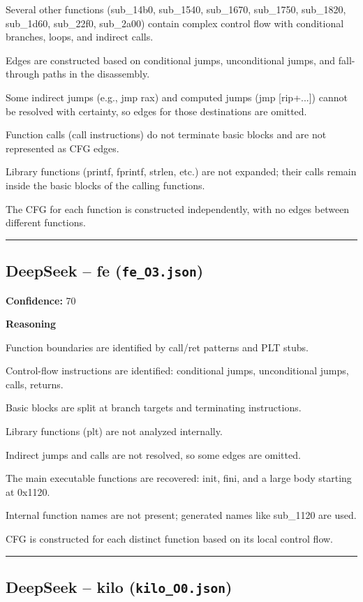 Several other functions (sub\_14b0, sub\_1540, sub\_1670, sub\_1750, sub\_1820, sub\_1d60, sub\_22f0, sub\_2a00) contain complex control flow with conditional branches, loops, and indirect calls.

Edges are constructed based on conditional jumps, unconditional jumps, and fall-through paths in the disassembly.

Some indirect jumps (e.g., jmp rax) and computed jumps (jmp [rip+...]) cannot be resolved with certainty, so edges for those destinations are omitted.

Function calls (call instructions) do not terminate basic blocks and are not represented as CFG edges.

Library functions (printf, fprintf, strlen, etc.) are not expanded; their calls remain inside the basic blocks of the calling functions.

The CFG for each function is constructed independently, with no edges between different functions.

\bigskip
\hrule
\bigskip

\subsection{DeepSeek -- fe (\texttt{fe\_O3.json})}

\textbf{Confidence:} 70

\textbf{Reasoning}

Function boundaries are identified by call/ret patterns and PLT stubs.

Control-flow instructions are identified: conditional jumps, unconditional jumps, calls, returns.

Basic blocks are split at branch targets and terminating instructions.

Library functions (plt) are not analyzed internally.

Indirect jumps and calls are not resolved, so some edges are omitted.

The main executable functions are recovered: init, fini, and a large body starting at 0x1120.

Internal function names are not present; generated names like sub\_1120 are used.

CFG is constructed for each distinct function based on its local control flow.

\bigskip
\hrule
\bigskip

\subsection{DeepSeek -- kilo (\texttt{kilo\_O0.json})}

